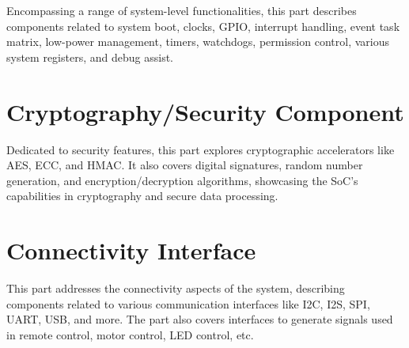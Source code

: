 \documentclass[openany, 10pt]{book}
\begin{document}

Encompassing a range of system-level functionalities, this part describes components related to system boot, clocks, GPIO, interrupt handling, event task matrix, low-power management,  timers, watchdogs, permission control, various system registers, and debug assist.


\part{Cryptography/Security Component}

Dedicated to security features, this part explores cryptographic accelerators like AES, ECC, and HMAC. It also covers digital signatures, random number generation, and encryption/decryption algorithms, showcasing the SoC's capabilities in cryptography and secure data processing.




\part{Connectivity Interface}


This part addresses the connectivity aspects of the system, describing components related to various communication interfaces like I2C, I2S, SPI, UART, USB, and more. The part also covers interfaces to generate signals used in remote control, motor control, LED control, etc.
\end{document}
